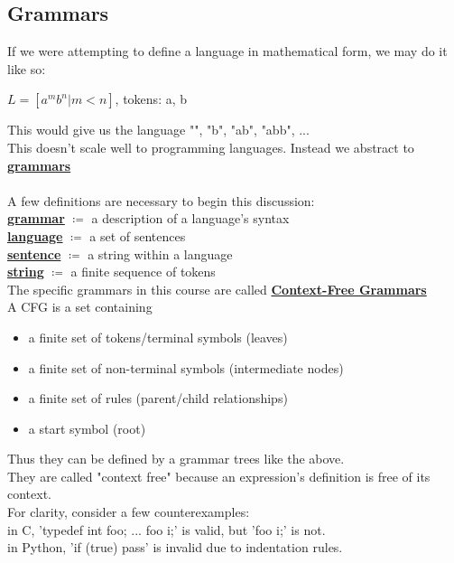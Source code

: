 \documentclass[../../lecture_notes.tex]{subfiles}
\begin{document}
\subsection*{Grammars}
\noindent If we were attempting to define a language in mathematical form, we may do it like so:
	\begin{center} $L = [a^m b^n | m < n]$, tokens: {a, b} \end{center}
This would give us the language {"", "b", "ab", "abb", ...}\\
This doesn't scale well to programming languages.  Instead we abstract to \textbf{\underline{grammars}}\\
\\
A few definitions are necessary to begin this discussion:\\
\indent \textbf{\underline{grammar}} $\coloneqq$ a description of a language's syntax\\
\indent \indent  \textbf{\underline{language}} $\coloneqq$ a set of sentences\\
\indent \indent  \textbf{\underline{sentence}} $\coloneqq$ a string within a language\\
\indent \indent  \textbf{\underline{string}} $\coloneqq$ a finite sequence of tokens\\
The specific grammars in this course are called \textbf{\underline{Context-Free Grammars}}\\
A CFG is a set containing \begin{itemize} [itemsep=0mm]
	\item a finite set of tokens/terminal symbols (leaves)
	\item a finite set of non-terminal symbols (intermediate nodes)
	\item a finite set of rules (parent/child relationships)
	\item a start symbol (root)
\end{itemize}
Thus they can be defined by a grammar trees like the above.\\
They are called "context free" because an expression's definition is free of its context.\\
For clarity, consider a few counterexamples:\\
\indent in C, 'typedef int foo; ... foo i;' is valid, but 'foo i;' is not.\\
\indent in Python, 'if (true) pass' is invalid due to indentation rules.
\end{document}
